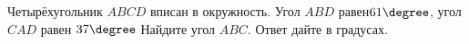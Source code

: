 \begin{ex}
	\begin{condition}
		Четырёхугольник \( ABCD \)  вписан в окружность. Угол \( ABD \)  равен\(  61\degree \), угол \( CAD \)  равен \( 37\degree \)  Найдите угол \( ABC \). Ответ дайте в градусах.
	\end{condition}
\end{ex}